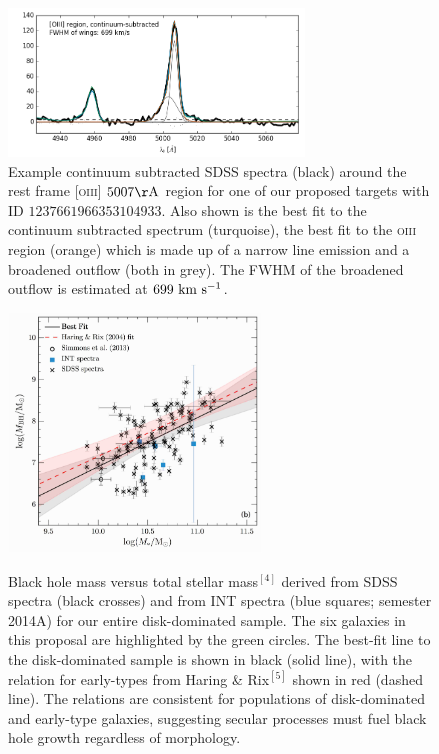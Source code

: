 \documentclass[12pt]{article}
\begin{document}
\vspace{1.5em}
\begin{figure}
\begin{centering}

\includegraphics[width=0.7\textwidth]{53062_1445_246_spectra_oiii_region.png} \\
\caption{Example continuum subtracted SDSS spectra (black) around the rest frame \textsc{[oiii]} $5007\rm{\AA}$ region for one of our proposed targets with ID $1237661966353104933$. Also shown is the best fit to the continuum subtracted spectrum (turquoise), the best fit to the \textsc{oiii} region (orange) which is made up of a narrow line emission and a broadened outflow (both in grey). The FWHM of the broadened outflow is estimated at $699~\rm{km}~\rm{s}^{-1}$.}

\vspace{1.5em}


\includegraphics[width=0.6\textwidth]{fig2_r.pdf} \\
\caption{Black hole mass versus total stellar mass$^{[4]}$ derived from SDSS spectra (black crosses) and from INT spectra (blue squares; semester 2014A) for our entire disk-dominated sample. The six galaxies in this proposal are highlighted by the green circles. The best-fit line to the disk-dominated sample is shown in black (solid line), with the relation for early-types from Haring \& Rix$^{[5]}$ shown in red (dashed line). The relations are consistent for populations of disk-dominated and early-type galaxies, suggesting secular processes must fuel black hole growth regardless of morphology.}

\end{centering}
\end{figure}
\end{document}
